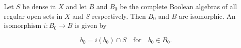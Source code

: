 Let $S$ be dense in $X$ and let $B$ and $B_0$ be the complete Boolean algebras of all regular open sets in $X$ and $S$ respectively. Then $B_0$ and $B$ are isomorphic. An isomorphism $i: B_0 \rightarrow B$ is given by

$$b_0 = i(b_0) \cap S \quad \text{for} \quad b_0 \in B_0.$$
